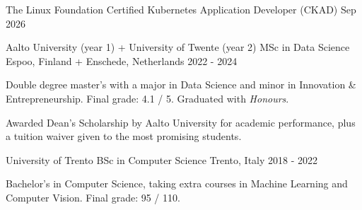 
\begin{cventries}
  \cventry
    {The Linux Foundation}
    {Certified Kubernetes Application Developer (CKAD)}
    {}
    {Sep 2026}
    {}
  \par\vspace{-6.0mm} %
  \cventry
    {Aalto University (year 1) + University of Twente (year 2)}
    {MSc in Data Science}
    {Espoo, Finland + Enschede, Netherlands}
    {2022 - 2024}
    {
      \begin{cvitems}
        \item {Double degree master's with a major in Data Science and minor in Innovation \& Entrepreneurship. Final grade: 4.1 / 5. Graduated with \textit{Honours}.}
        \item {Awarded Dean's Scholarship by Aalto University for academic performance, plus a tuition waiver given to the most promising students.}
      \end{cvitems}
    }
  \cventry
    {University of Trento}
    {BSc in Computer Science}
    {Trento, Italy}
    {2018 - 2022}
    {
      \begin{cvitems}
        \item {Bachelor's in Computer Science, taking extra courses in Machine Learning and Computer Vision. Final grade: 95 / 110.}
      \end{cvitems}
    }
\end{cventries}

